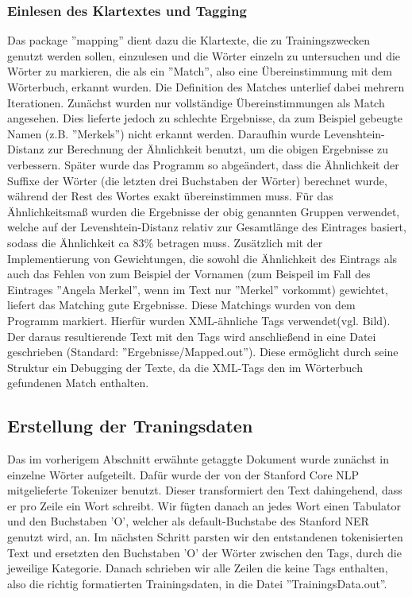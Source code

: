 \documentclass[a4paper]{article}
\begin{document}
		\subsubsection{Einlesen des Klartextes und Tagging}
			Das package ''mapping'' dient dazu die Klartexte, die zu Trainingszwecken genutzt werden sollen, einzulesen und die Wörter einzeln zu untersuchen und die Wörter zu markieren, die als ein ''Match'', also eine Übereinstimmung mit dem Wörterbuch, erkannt wurden.
			Die Definition des Matches unterlief dabei mehrern Iterationen. 
			Zunächst wurden nur vollständige Übereinstimmungen als Match angesehen.
			Dies lieferte jedoch zu schlechte Ergebnisse, da zum Beispiel gebeugte Namen (z.B. ''Merkels'') nicht erkannt werden.
			Daraufhin wurde Levenshtein-Distanz zur Berechnung der Ähnlichkeit benutzt, um die obigen Ergebnisse zu verbessern. 
			Später wurde das Programm so abgeändert, dass die Ähnlichkeit der Suffixe der Wörter (die letzten drei Buchstaben der Wörter) berechnet wurde, während der Rest des Wortes exakt übereinstimmen muss. 
			Für das Ähnlichkeitsmaß wurden die Ergebnisse der obig genannten Gruppen verwendet, welche auf der Levenshtein-Distanz relativ zur Gesamtlänge des Eintrages basiert, sodass die Ähnlichkeit ca 83\% betragen muss.
			Zusätzlich mit der Implementierung von Gewichtungen, die sowohl die Ähnlichkeit des Eintrags als auch das Fehlen von zum Beispiel der Vornamen (zum Beispeil im Fall des Eintrages ''Angela Merkel'', wenn im Text nur ''Merkel'' vorkommt) gewichtet, liefert das Matching gute Ergebnisse. 
			Diese Matchings wurden von dem Programm markiert. 
			Hierfür wurden XML-ähnliche Tags verwendet(vgl. Bild).
			Der daraus resultierende Text mit den Tags wird anschließend in eine Datei geschrieben (Standard: ''Ergebnisse/Mapped.out''). 
			Diese ermöglicht durch seine Struktur ein Debugging der Texte, da die XML-Tags den im Wörterbuch gefundenen Match enthalten.

	\subsection{Erstellung der Traningsdaten}
		Das im vorherigem Abschnitt erwähnte getaggte Dokument wurde zunächst in einzelne Wörter aufgeteilt. 
		Dafür wurde der von der Stanford Core NLP mitgelieferte Tokenizer benutzt. 
		Dieser transformiert den Text dahingehend, dass er pro Zeile ein Wort schreibt. 
		Wir fügten danach an jedes Wort einen Tabulator und den Buchstaben 'O', welcher als default-Buchstabe des Stanford NER genutzt wird, an.
		Im nächsten Schritt parsten wir den entstandenen tokenisierten Text und ersetzten den Buchstaben 'O' der Wörter zwischen den Tags, durch die jeweilige Kategorie. 
		Danach schrieben wir alle Zeilen die keine Tags enthalten, also die richtig formatierten Trainingsdaten, in die Datei ''TrainingsData.out''.
	
\end{document}
